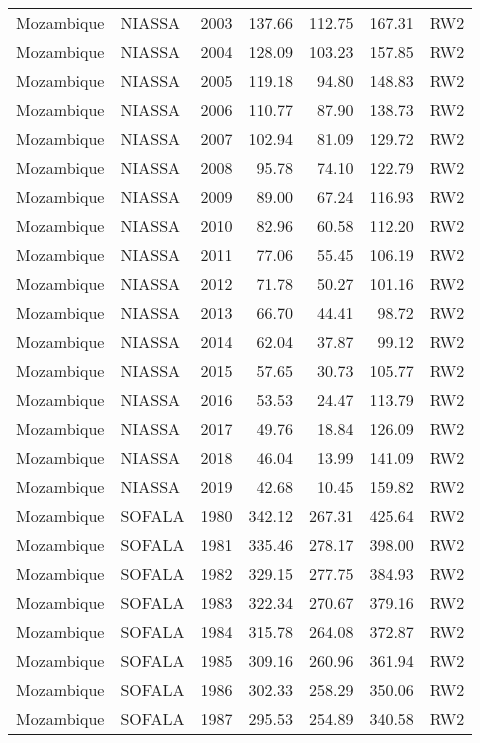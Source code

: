 \begin{longtable}{lllrrrl}
  Mozambique & NIASSA & 2003 & 137.66 & 112.75 & 167.31 & RW2 \\ 
  Mozambique & NIASSA & 2004 & 128.09 & 103.23 & 157.85 & RW2 \\ 
  Mozambique & NIASSA & 2005 & 119.18 & 94.80 & 148.83 & RW2 \\ 
  Mozambique & NIASSA & 2006 & 110.77 & 87.90 & 138.73 & RW2 \\ 
  Mozambique & NIASSA & 2007 & 102.94 & 81.09 & 129.72 & RW2 \\ 
  Mozambique & NIASSA & 2008 & 95.78 & 74.10 & 122.79 & RW2 \\ 
  Mozambique & NIASSA & 2009 & 89.00 & 67.24 & 116.93 & RW2 \\ 
  Mozambique & NIASSA & 2010 & 82.96 & 60.58 & 112.20 & RW2 \\ 
  Mozambique & NIASSA & 2011 & 77.06 & 55.45 & 106.19 & RW2 \\ 
  Mozambique & NIASSA & 2012 & 71.78 & 50.27 & 101.16 & RW2 \\ 
  Mozambique & NIASSA & 2013 & 66.70 & 44.41 & 98.72 & RW2 \\ 
  Mozambique & NIASSA & 2014 & 62.04 & 37.87 & 99.12 & RW2 \\ 
  Mozambique & NIASSA & 2015 & 57.65 & 30.73 & 105.77 & RW2 \\ 
  Mozambique & NIASSA & 2016 & 53.53 & 24.47 & 113.79 & RW2 \\ 
  Mozambique & NIASSA & 2017 & 49.76 & 18.84 & 126.09 & RW2 \\ 
  Mozambique & NIASSA & 2018 & 46.04 & 13.99 & 141.09 & RW2 \\ 
  Mozambique & NIASSA & 2019 & 42.68 & 10.45 & 159.82 & RW2 \\ 
  Mozambique & SOFALA & 1980 & 342.12 & 267.31 & 425.64 & RW2 \\ 
  Mozambique & SOFALA & 1981 & 335.46 & 278.17 & 398.00 & RW2 \\ 
  Mozambique & SOFALA & 1982 & 329.15 & 277.75 & 384.93 & RW2 \\ 
  Mozambique & SOFALA & 1983 & 322.34 & 270.67 & 379.16 & RW2 \\ 
  Mozambique & SOFALA & 1984 & 315.78 & 264.08 & 372.87 & RW2 \\ 
  Mozambique & SOFALA & 1985 & 309.16 & 260.96 & 361.94 & RW2 \\ 
  Mozambique & SOFALA & 1986 & 302.33 & 258.29 & 350.06 & RW2 \\ 
  Mozambique & SOFALA & 1987 & 295.53 & 254.89 & 340.58 & RW2 \\ 

\end{longtable}
